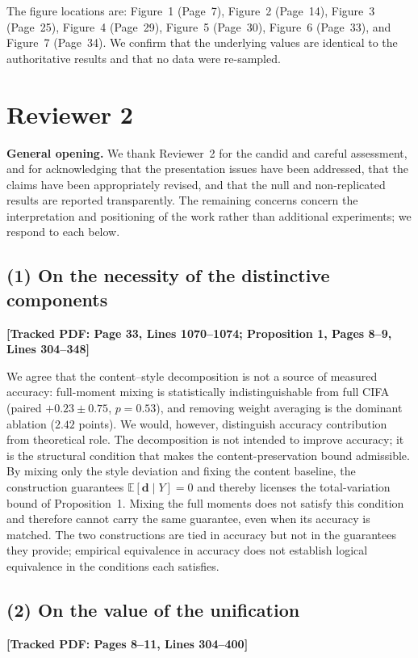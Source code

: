 \documentclass[11pt]{article}
\newcommand{\loc}[1]{\textbf{[\textcolor{revblue}{Tracked PDF: #1}]}}
\begin{document}
The figure locations are: Figure~1 (Page~7), Figure~2 (Page~14), Figure~3
(Page~25), Figure~4 (Page~29), Figure~5 (Page~30), Figure~6 (Page~33), and
Figure~7 (Page~34). We confirm that the underlying values are identical to the
authoritative results and that no data were re-sampled.

\section*{Reviewer 2}

\textbf{General opening.} We thank Reviewer~2 for the candid and careful
assessment, and for acknowledging that the presentation issues have been
addressed, that the claims have been appropriately revised, and that the null
and non-replicated results are reported transparently. The remaining concerns
concern the interpretation and positioning of the work rather than additional
experiments; we respond to each below.

\subsection*{(1) On the necessity of the distinctive components}
\loc{Page 33, Lines 1070--1074; Proposition 1, Pages 8--9, Lines 304--348}

We agree that the content--style decomposition is not a source of measured
accuracy: full-moment mixing is statistically indistinguishable from full
CIFA (paired $+0.23\pm0.75$, $p=0.53$), and removing weight averaging is the
dominant ablation ($2.42$ points). We would, however, distinguish accuracy
contribution from theoretical role. The decomposition is not intended to
improve accuracy; it is the structural condition that makes the
content-preservation bound admissible. By mixing only the style deviation and
fixing the content baseline, the construction guarantees
$\mathbb{E}[\mathbf{d}\mid Y]=0$ and thereby licenses the total-variation
bound of Proposition~1. Mixing the full moments does not satisfy this
condition and therefore cannot carry the same guarantee, even when its
accuracy is matched. The two constructions are tied in accuracy but not in the
guarantees they provide; empirical equivalence in accuracy does not establish
logical equivalence in the conditions each satisfies.

\subsection*{(2) On the value of the unification}
\loc{Pages 8--11, Lines 304--400}
\end{document}
